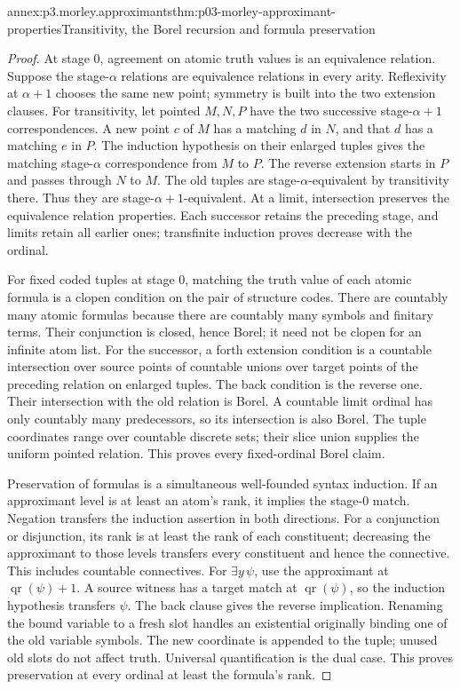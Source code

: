 \begin{annexitem}{annex:p3.morley.approximants}{thm:p03-morley-approximant-properties}{Transitivity, the Borel recursion and formula preservation}
\begin{proof}
At stage \(0\), agreement on atomic truth values is
an equivalence relation. Suppose the stage-\(\alpha\)
relations are equivalence relations in every arity.
Reflexivity at \(\alpha+1\) chooses the same new point;
symmetry is built into the two extension clauses.
For transitivity, let pointed \(M,N,P\) have the
two successive stage-\(\alpha+1\) correspondences.
A new point \(c\) of \(M\) has a matching \(d\)
in \(N\), and that \(d\) has a matching \(e\)
in \(P\). The induction hypothesis on their
enlarged tuples gives the matching stage-\(\alpha\)
correspondence from \(M\) to \(P\).
The reverse extension starts in \(P\) and passes
through \(N\) to \(M\).
The old tuples are stage-\(\alpha\)-equivalent
by transitivity there.
Thus they are stage-\(\alpha+1\)-equivalent.
At a limit, intersection preserves the equivalence
relation properties. Each successor retains the
preceding stage, and limits retain all earlier ones;
transfinite induction proves decrease with the ordinal.

For fixed coded tuples at stage \(0\), matching the
truth value of each atomic formula is a clopen
condition on the pair of structure codes.
There are countably many atomic formulas because
there are countably many symbols and finitary terms.
Their conjunction is closed, hence Borel; it need
not be clopen for an infinite atom list.
For the successor, a forth extension condition is
a countable intersection over source points of
countable unions over target points of the preceding
relation on enlarged tuples. The back condition is
the reverse one.
Their intersection with the old relation is Borel.
A countable limit ordinal has only countably many
predecessors, so its intersection is also Borel.
The tuple coordinates range over countable discrete
sets; their slice union supplies the uniform pointed
relation. This proves every fixed-ordinal Borel claim.

Preservation of formulas is a simultaneous
well-founded syntax induction. If an approximant
level is at least an atom's rank, it implies the
stage-\(0\) match. Negation transfers the induction
assertion in both directions. For a conjunction or
disjunction, its rank is at least the rank of each
constituent; decreasing the approximant to those
levels transfers every constituent and hence the
connective. This includes countable connectives.
For \(\exists y\,\psi\), use the approximant at
\(\operatorname{qr}(\psi)+1\).
A source witness has a target match at
\(\operatorname{qr}(\psi)\), so the induction
hypothesis transfers \(\psi\).
The back clause gives the reverse implication.
Renaming the bound variable to a fresh slot handles
an existential originally binding one of the old
variable symbols. The new coordinate is appended
to the tuple; unused old slots do not affect truth.
Universal quantification is the dual case.
This proves preservation at every ordinal at least
the formula's rank.
\end{proof}
\end{annexitem}

